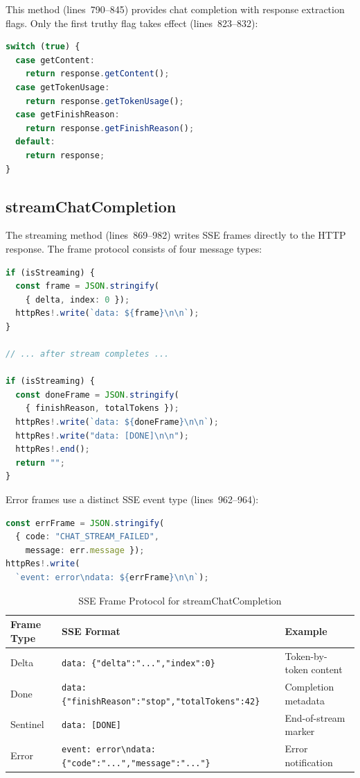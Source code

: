 \documentclass[11pt]{article}
\begin{document}
This method (lines~790--845) provides chat completion with response extraction
flags. Only the first truthy flag takes effect (lines~823--832):

\begin{lstlisting}[language=TypeScript,caption={Response extraction flags (cap-llm-plugin.ts, lines 823--832)},firstnumber=823]
switch (true) {
  case getContent:
    return response.getContent();
  case getTokenUsage:
    return response.getTokenUsage();
  case getFinishReason:
    return response.getFinishReason();
  default:
    return response;
}
\end{lstlisting}

\subsection{streamChatCompletion}

The streaming method (lines~869--982) writes SSE frames directly to the HTTP
response. The frame protocol consists of four message types:

\begin{lstlisting}[language=TypeScript,caption={SSE frame emission (cap-llm-plugin.ts, lines 931--949)},firstnumber=931]
if (isStreaming) {
  const frame = JSON.stringify(
    { delta, index: 0 });
  httpRes!.write(`data: ${frame}\n\n`);
}

// ... after stream completes ...

if (isStreaming) {
  const doneFrame = JSON.stringify(
    { finishReason, totalTokens });
  httpRes!.write(`data: ${doneFrame}\n\n`);
  httpRes!.write("data: [DONE]\n\n");
  httpRes!.end();
  return "";
}
\end{lstlisting}

Error frames use a distinct SSE event type (lines~962--964):

\begin{lstlisting}[language=TypeScript,caption={Error frame emission (cap-llm-plugin.ts, lines 962--964)},firstnumber=962]
const errFrame = JSON.stringify(
  { code: "CHAT_STREAM_FAILED",
    message: err.message });
httpRes!.write(
  `event: error\ndata: ${errFrame}\n\n`);
\end{lstlisting}

\begin{table}[h]
\centering
\caption{SSE Frame Protocol for streamChatCompletion}
\begin{tabular}{@{}lll@{}}
\toprule
\textbf{Frame Type} & \textbf{SSE Format} & \textbf{Example} \\
\midrule
Delta & \texttt{data: \{"delta":"...","index":0\}} & Token-by-token content \\
Done & \texttt{data: \{"finishReason":"stop","totalTokens":42\}} & Completion metadata \\
Sentinel & \texttt{data: [DONE]} & End-of-stream marker \\
Error & \texttt{event: error\textbackslash ndata: \{"code":"...","message":"..."\}} & Error notification \\
\bottomrule
\end{tabular}
\end{table}
\end{document}

